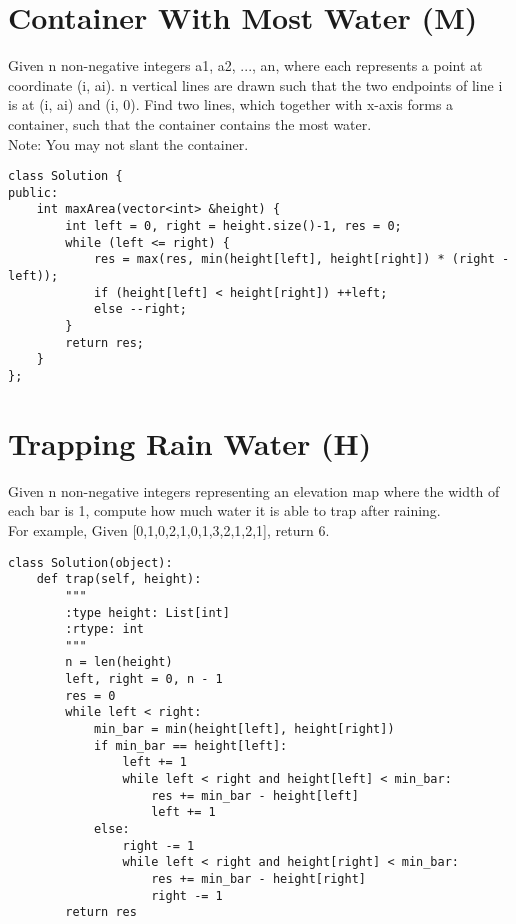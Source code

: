\section{Container With Most Water (M)}
Given n non-negative integers a1, a2, ..., an, where each represents a point at coordinate (i, ai). n vertical lines are drawn such that the two endpoints of line i is at (i, ai) and (i, 0). Find two lines, which together with x-axis forms a container, such that the container contains the most water.\\

Note: You may not slant the container. \\

\begin{lstlisting}
class Solution {
public:
    int maxArea(vector<int> &height) {
        int left = 0, right = height.size()-1, res = 0;
        while (left <= right) {
            res = max(res, min(height[left], height[right]) * (right - left));
            if (height[left] < height[right]) ++left;
            else --right;
        }
        return res;
    }
};
\end{lstlisting}


\section {Trapping Rain Water (H)}
Given n non-negative integers representing an elevation map where the width of each bar is 1, compute how much water it is able to trap after raining.\\

For example, Given [0,1,0,2,1,0,1,3,2,1,2,1], return 6. \\

\begin{lstlisting}
class Solution(object):
    def trap(self, height):
        """
        :type height: List[int]
        :rtype: int
        """
        n = len(height)
        left, right = 0, n - 1
        res = 0
        while left < right:
            min_bar = min(height[left], height[right])
            if min_bar == height[left]:
                left += 1
                while left < right and height[left] < min_bar:
                    res += min_bar - height[left]
                    left += 1
            else:
                right -= 1
                while left < right and height[right] < min_bar:
                    res += min_bar - height[right]
                    right -= 1
        return res
\end{lstlisting}

